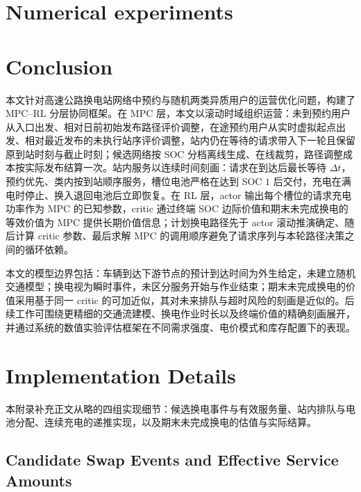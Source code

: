 \documentclass[12pt,a4paper,UTF8]{ctexart}
\begin{document}
\section{Numerical experiments}



\section{Conclusion}

本文针对高速公路换电站网络中预约与随机两类异质用户的运营优化问题，构建了 MPC--RL 分层协同框架。在 MPC 层，本文以滚动时域组织运营：未到预约用户从入口出发、相对日前初始发布路径评价调整，在途预约用户从实时虚拟起点出发、相对最近发布的未执行站序评价调整，站内仍在等待的请求带入下一轮且保留原到站时刻与截止时刻；候选网络按 SOC 分档离线生成、在线裁剪，路径调整成本按实际发布结算一次。站内服务以连续时间刻画：请求在到达后最长等待 $\Delta t$，预约优先、类内按到站顺序服务，槽位电池严格在达到 SOC $1$ 后交付，充电在满电时停止、换入退回电池后立即恢复。在 RL 层，actor 输出每个槽位的请求充电功率作为 MPC 的已知参数，critic 通过终端 SOC 边际价值和期末未完成换电的等效价值为 MPC 提供长期价值信息；计划换电路径先于 actor 滚动推演确定、随后计算 critic 参数、最后求解 MPC 的调用顺序避免了请求序列与本轮路径决策之间的循环依赖。

本文的模型边界包括：车辆到达下游节点的预计到达时间为外生给定，未建立随机交通模型；换电视为瞬时事件，未区分服务开始与作业结束；期末未完成换电的价值采用基于同一 critic 的可加近似，其对未来排队与超时风险的刻画是近似的。后续工作可围绕更精细的交通流建模、换电作业时长以及终端价值的精确刻画展开，并通过系统的数值实验评估框架在不同需求强度、电价模式和库存配置下的表现。


\appendix

\section{Implementation Details}
\label{app:impl}

本附录补充正文从略的四组实现细节：候选换电事件与有效服务量、站内排队与电池分配、连续充电的递推实现，以及期末未完成换电的估值与实际结算。

\subsection{Candidate Swap Events and Effective Service Amounts}
\end{document}
